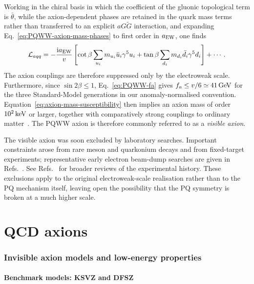 \documentclass[review]{elsarticle}
\numberwithin{equation}{section}
\numberwithin{table}{section}
\numberwithin{figure}{section}
\def\i{\mathrm{i}}
\begin{document}
Working in the chiral basis in which the coefficient of the gluonic topological term is $\bar\theta$, while the axion-dependent phases are retained in the quark mass terms rather than transferred to an explicit $aG\widetilde G$ interaction, and expanding Eq.~\eqref{eq:PQWW-axion-mass-phases} to first order in $a_{\rm EW}$, one finds 
\begin{align}
    \mathcal{L}_{aqq} =
    -\frac{\i a_{\rm EW}}{v}
    \left[ \cot\beta \sum_{u_i}m_{u_i}\bar u_i\gamma^5u_i + \tan\beta \sum_{d_i}m_{d_i}\bar d_i\gamma^5d_i \right] +\cdots .
    \label{eq:PQWW-quark-couplings}
\end{align}
The axion couplings are therefore suppressed only by the electroweak scale. Furthermore, since $\sin2\beta\leq1$, Eq.~\eqref{eq:PQWW-fa} gives $f_a\leq v/6\simeq41\,{\rm GeV}$ for the three Standard-Model generations in our anomaly-normalised convention. Equation~\eqref{eq:axion-mass-susceptibility} then implies an axion mass of order $10^2\,{\rm keV}$ or larger, together with comparatively strong couplings to ordinary matter~\cite{Weinberg:1977ma,Wilczek:1977pj}. The PQWW axion is therefore commonly referred to as a \emph{visible axion}.

The visible axion was soon excluded by laboratory searches. Important constraints arose from rare meson and quarkonium decays and from fixed-target experiments; representative early electron beam-dump searches are given in Refs.~\cite{Konaka:1986cb,Riordan:1987aw,Bjorken:1988as}. See Refs.~\cite{Peccei:2006as,Kim:2008hd,DiLuzio:2020wdo} for broader reviews of the experimental history. These exclusions apply to the original electroweak-scale realisation rather than to the PQ mechanism itself, leaving open the possibility that the PQ symmetry is broken at a much higher scale.

\part{QCD axions}
\label{part:QCD-axions}

\section{Invisible axion models and low-energy properties}

\subsection{Benchmark models: KSVZ and DFSZ}
\label{sec:KSVZ-DFSZ}
\end{document}
